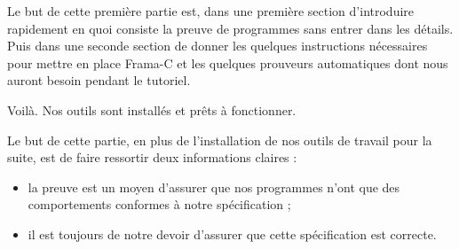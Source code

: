 
Le but de cette première partie est, dans une première section d'introduire
rapidement en quoi consiste la preuve de programmes sans entrer dans les 
détails. Puis dans une seconde section de donner les quelques instructions 
nécessaires pour mettre en place Frama-C et les quelques prouveurs 
automatiques dont nous auront besoin pendant le tutoriel.












\horizontalLine



Voilà. Nos outils sont installés et prêts à fonctionner.



Le but de cette partie, en plus de l'installation de nos outils de travail
pour la suite, est de faire ressortir deux informations claires :



\begin{itemize}
\item la preuve est un moyen d'assurer que nos programmes n'ont que des 
comportements conformes à notre spécification ;
\item il est toujours de notre devoir d'assurer que cette spécification est
correcte.
\end{itemize}
